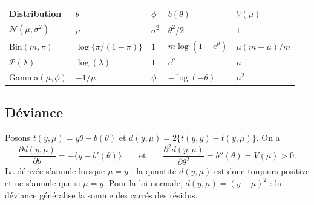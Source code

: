 \documentclass[
  french,
  letterpaper,
  DIV=11,
  numbers=noendperiod]{scrreprt}
\newcounter{none} %
\begin{document}
{\def\LTcaptype{none} %
\begin{longtable}[]{@{}
  >{\raggedright\arraybackslash}p{}
  >{\raggedright\arraybackslash}p{}
  >{\raggedright\arraybackslash}p{}
  >{\raggedright\arraybackslash}p{}
  >{\raggedright\arraybackslash}p{}@{}}
\toprule\noalign{}
\begin{minipage}[b]{\linewidth}\raggedright
Distribution
\end{minipage} & \begin{minipage}[b]{\linewidth}\raggedright
\(\theta\)
\end{minipage} & \begin{minipage}[b]{\linewidth}\raggedright
\(\phi\)
\end{minipage} & \begin{minipage}[b]{\linewidth}\raggedright
\(b(\theta)\)
\end{minipage} & \begin{minipage}[b]{\linewidth}\raggedright
\(V(\mu)\)
\end{minipage} \\
\midrule\noalign{}
\endhead
\bottomrule\noalign{}
\endlastfoot
\(\mathcal{N}(\mu,\sigma^2)\) & \(\mu\) & \(\sigma^2\) & \(\theta^2/2\)
& \(1\) \\
\(\mathrm{Bin}(m,\pi)\) & \(\log\{\pi/(1-\pi)\}\) & \(1\) &
\(m\log(1+e^\theta)\) & \(\mu(m-\mu)/m\) \\
\(\mathcal{P}(\lambda)\) & \(\log(\lambda)\) & \(1\) & \(e^\theta\) &
\(\mu\) \\
\(\mathrm{Gamma}(\mu,\phi)\) & \(-1/\mu\) & \(\phi\) &
\(-\log(-\theta)\) & \(\mu^2\) \\
\end{longtable}
}

\subsection{Déviance}\label{duxe9viance}

Posons \(t(y,\mu) = y\theta - b(\theta)\) et
\(d(y,\mu) = 2\{t(y,y) - t(y,\mu)\}\). On a
\[\frac{\partial d(y,\mu)}{\partial\theta} = -\{y - b'(\theta)\} \qquad \mbox{et} \qquad \frac{\partial^2 d(y,\mu)}{\partial\theta^2} = b''(\theta) = V(\mu) > 0.\]
La dérivée s'annule lorsque \(\mu = y\) : la quantité \(d(y,\mu)\) est
donc toujours positive et ne s'annule que si \(\mu = y\). Pour la loi
normale, \(d(y,\mu) = (y-\mu)^2\) : la déviance généralise la somme des
carrés des résidus.
\end{document}
